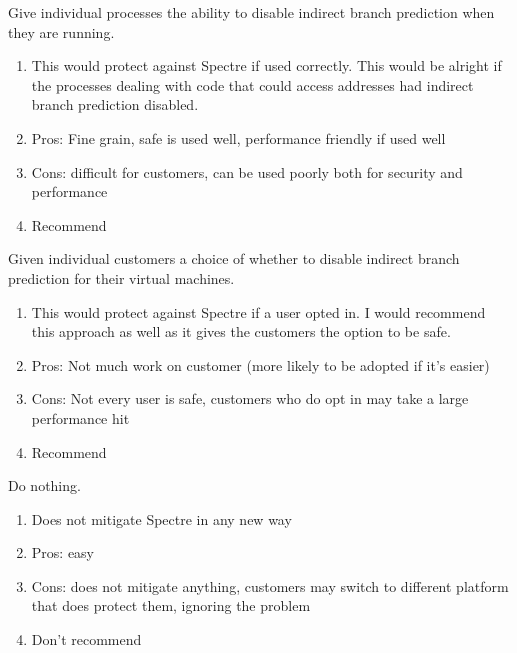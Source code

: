 \documentclass{article}
\begin{document}
\begin{homeworkProblem}[3]
      Give individual processes the ability to disable indirect branch prediction when they are running.
      \begin{enumerate}
        \item This would protect against Spectre if used correctly. This would be alright if the processes dealing with code that could access addresses had indirect branch prediction disabled. 
        \item Pros: Fine grain, safe is used well, performance friendly if used well
        \item Cons: difficult for customers, can be used poorly both for security and performance
        \item Recommend
      \end{enumerate}
      
      Given individual customers a choice of whether to disable indirect branch prediction for their virtual machines.     
      \begin{enumerate}
        \item  This would protect against Spectre if a user opted in. I would recommend this approach as well as it gives the customers the option to be safe. 
        \item Pros: Not much work on customer (more likely to be adopted if it's easier)
        \item Cons: Not every user is safe, customers who do opt in may take a large performance hit
        \item Recommend
      \end{enumerate}
      
      Do nothing.
      \begin{enumerate}
        \item Does not mitigate Spectre in any new way
        \item Pros: easy
        \item Cons: does not mitigate anything, customers may switch to different platform that does protect them, ignoring the problem
        \item Don't recommend
      \end{enumerate}
  \end{homeworkProblem}
\end{document}
